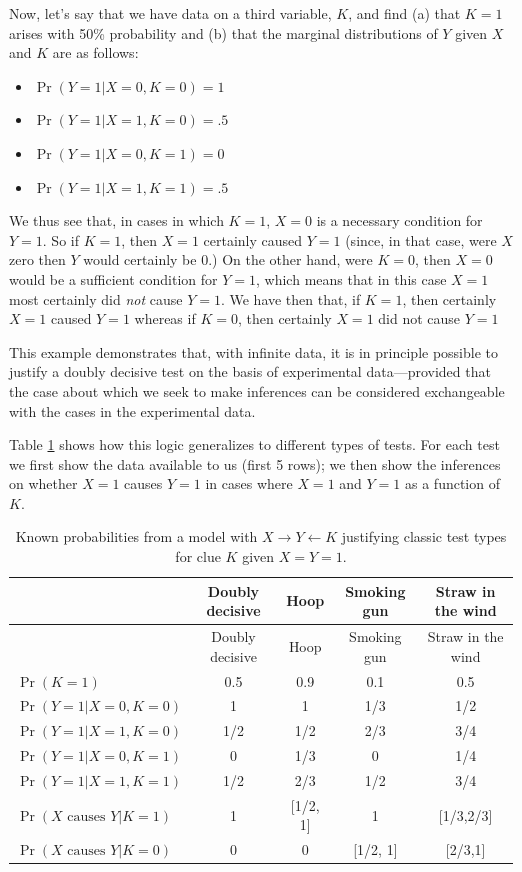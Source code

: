 \documentclass[
  12pt,
]{book}
\providecommand{\tightlist}{%
  \setlength{\itemsep}{0pt}\setlength{\parskip}{0pt}}
\begin{document}
Now, let's say that we have data on a third variable, \(K\), and find (a) that \(K=1\) arises with 50\% probability and (b) that the marginal distributions of \(Y\) given \(X\) and \(K\) are as follows:

\begin{itemize}
\tightlist
\item
  \(\Pr(Y=1|X=0, K = 0) = 1\)
\item
  \(\Pr(Y=1|X=1, K = 0) = .5\)
\item
  \(\Pr(Y=1|X=0, K = 1) = 0\)
\item
  \(\Pr(Y=1|X=1, K = 1) = .5\)
\end{itemize}

We thus see that, in cases in which \(K=1\), \(X=0\) is a necessary condition for \(Y=1\). So if \(K=1\), then \(X=1\) certainly caused \(Y=1\) (since, in that case, were \(X\) zero then \(Y\) would certainly be 0.) On the other hand, were \(K=0\), then \(X=0\) would be a sufficient condition for \(Y=1\), which means that in this case \(X=1\) most certainly did \emph{not} cause \(Y=1\). We have then that, if \(K=1\), then certainly \(X=1\) caused \(Y=1\) whereas if \(K=0\), then certainly \(X=1\) did not cause \(Y=1\)

This example demonstrates that, with infinite data, it is in principle possible to justify a doubly decisive test on the basis of experimental data---provided that the case about which we seek to make inferences can be considered exchangeable with the cases in the experimental data.

Table \ref{tab:tests15} shows how this logic generalizes to different types of tests. For each test we first show the data available to us (first 5 rows); we then show the inferences on whether \(X=1\) causes \(Y=1\) in cases where \(X=1\) and \(Y=1\) as a function of \(K\).

\begin{longtable}[]{@{}lcccc@{}}
\caption{\label{tab:tests15}Known probabilities from a model with \(X \rightarrow Y \leftarrow K\) justifying classic test types for clue \(K\) given \(X=Y=1\).}\tabularnewline
\toprule
& Doubly decisive & Hoop & Smoking gun & Straw in the wind \\
\midrule
\endfirsthead
\toprule
& Doubly decisive & Hoop & Smoking gun & Straw in the wind \\
\midrule
\endhead
\(\Pr(K = 1)\) & 0.5 & 0.9 & 0.1 & 0.5 \\
\(\Pr(Y=1 \vert X=0, K = 0)\) & 1 & 1 & 1/3 & 1/2 \\
\(\Pr(Y=1 \vert X=1, K = 0)\) & 1/2 & 1/2 & 2/3 & 3/4 \\
\(\Pr(Y=1 \vert X=0, K = 1)\) & 0 & 1/3 & 0 & 1/4 \\
\(\Pr(Y=1 \vert X=1, K = 1)\) & 1/2 & 2/3 & 1/2 & 3/4 \\
\(\Pr(X \text{  causes }Y \vert K=1)\) & 1 & {[}1/2, 1{]} & 1 & {[}1/3,2/3{]} \\
\(\Pr(X \text{  causes }Y \vert K=0)\) & 0 & 0 & {[}1/2, 1{]} & {[}2/3,1{]} \\
\bottomrule
\end{longtable}
\end{document}
